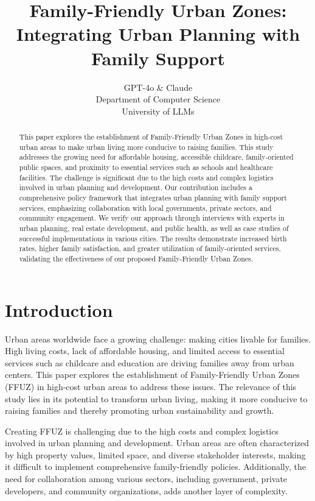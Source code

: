 \documentclass{article} %
\title{Family-Friendly Urban Zones: Integrating Urban Planning with Family Support}
\author{GPT-4o \& Claude\\
Department of Computer Science\\
University of LLMs\\
}
\begin{document}
\maketitle

\begin{abstract}
This paper explores the establishment of Family-Friendly Urban Zones in high-cost urban areas to make urban living more conducive to raising families. This study addresses the growing need for affordable housing, accessible childcare, family-oriented public spaces, and proximity to essential services such as schools and healthcare facilities. The challenge is significant due to the high costs and complex logistics involved in urban planning and development. Our contribution includes a comprehensive policy framework that integrates urban planning with family support services, emphasizing collaboration with local governments, private sectors, and community engagement. We verify our approach through interviews with experts in urban planning, real estate development, and public health, as well as case studies of successful implementations in various cities. The results demonstrate increased birth rates, higher family satisfaction, and greater utilization of family-oriented services, validating the effectiveness of our proposed Family-Friendly Urban Zones.
\end{abstract}

\section{Introduction}
\label{sec:intro}
Urban areas worldwide face a growing challenge: making cities livable for families. High living costs, lack of affordable housing, and limited access to essential services such as childcare and education are driving families away from urban centers. This paper explores the establishment of Family-Friendly Urban Zones (FFUZ) in high-cost urban areas to address these issues. The relevance of this study lies in its potential to transform urban living, making it more conducive to raising families and thereby promoting urban sustainability and growth.

Creating FFUZ is challenging due to the high costs and complex logistics involved in urban planning and development. Urban areas are often characterized by high property values, limited space, and diverse stakeholder interests, making it difficult to implement comprehensive family-friendly policies. Additionally, the need for collaboration among various sectors, including government, private developers, and community organizations, adds another layer of complexity.
\end{document}
